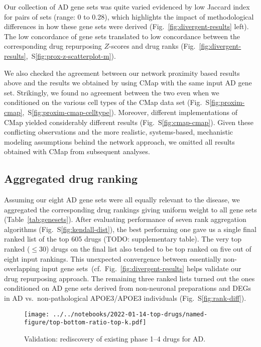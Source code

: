 \documentclass[letterpaper]{article}
\begin{document}
Our collection of AD gene sets was quite varied evidenced by low Jaccard index
for pairs of sets (range: 0 to 0.28), which
highlights the impact of methodological differences in how these gene sets
were derived (Fig.~\ref{fig:divergent-results} left). The low concordance of
gene sets translated to low concordance between the corresponding drug
repurposing $Z$-scores and drug ranks
(Fig.~\ref{fig:divergent-results},~S\ref{fig:prox-z-scatterplot-m}).

We also checked the agreement between our network proximity based results
above and the results we obtained by using CMap with the same input AD gene
set.  Strikingly, we found no agreement between the two even when we
conditioned on the various cell types of the CMap data set
(Fig.~S\ref{fig:proxim-cmap},~S\ref{fig:proxim-cmap-celltype}).  Moreover,
different implementations of CMap yielded considerably different results
(Fig.~S\ref{fig:cmap-cmap}).  Given these conflicting observations and the more realistic,
systems-based, mechanistic modeling assumptions behind the network approach,
we omitted all results obtained with CMap from subsequent analyses.

\subsection{Aggregated drug ranking}

Assuming our eight AD gene sets were all equally relevant to the disease, we
aggregated the corresponding drug rankings giving uniform weight to all gene
sets (Table~\ref{tab:genesets}).  After evaluating performance of seven rank
aggregation algorithms (Fig.~S\ref{fig:kendall-dist}), the best performing one
gave us a single final ranked list of the top 605 drugs (TODO: supplementary table).
The very top ranked ($\le 30$) drugs on the final list also tended to be top ranked
on five out of eight input rankings.  This unexpected convergence between
essentially non-overlapping input gene
sets~(cf.~Fig.~\ref{fig:divergent-results} helps validate our drug repurposing approach.
The remaining three ranked lists turned out the ones
conditioned on AD gene sets derived from non-neuronal preparations and DEGs in
AD vs.~non-pathological APOE3/APOE3 individuals (Fig.~S\ref{fig:rank-diff}).

\begin{figure}
\texttt{[image: ../../notebooks/2022-01-14-top-drugs/named-figure/top-bottom-ratio-top-k.pdf]}
\caption{
Validation: rediscovery of existing phase 1--4 drugs for AD.
}
\label{fig:ad-drug-rediscovery}
\end{figure}
\end{document}
